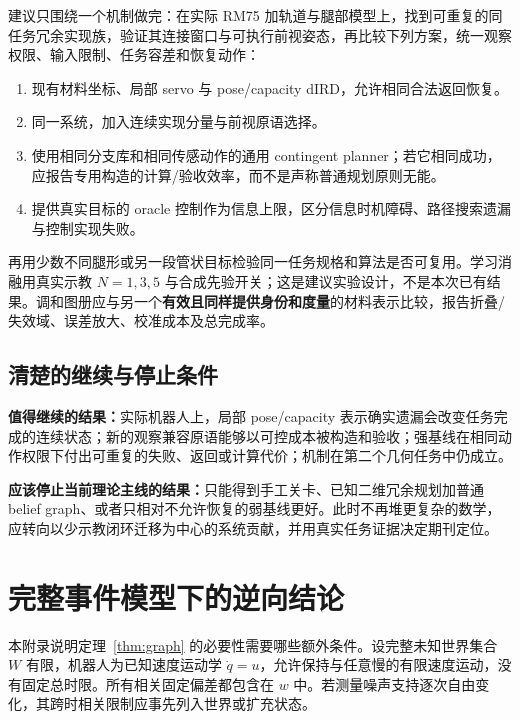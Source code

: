 \documentclass[11pt,a4paper]{article}
\theoremstyle{cn}
\begin{document}
建议只围绕一个机制做完：在实际 RM75 加轨道与腿部模型上，找到可重复的同任务冗余实现族，验证其连接窗口与可执行前视姿态，再比较下列方案，统一观察权限、输入限制、任务容差和恢复动作：

\begin{enumerate}
\item 现有材料坐标、局部 servo 与 pose/capacity dIRD，允许相同合法返回恢复。
\item 同一系统，加入连续实现分量与前视原语选择。
\item 使用相同分支库和相同传感动作的通用 contingent planner；若它相同成功，应报告专用构造的计算/验收效率，而不是声称普通规划原则无能。
\item 提供真实目标的 oracle 控制作为信息上限，区分信息时机障碍、路径搜索遗漏与控制实现失败。
\end{enumerate}

再用少数不同腿形或另一段管状目标检验同一任务规格和算法是否可复用。学习消融用真实示教 \(N=1,3,5\) 与合成先验开关；这是建议实验设计，不是本次已有结果。调和图册应与另一个\textbf{有效且同样提供身份和度量}的材料表示比较，报告折叠/失效域、误差放大、校准成本及总完成率。

\subsection{清楚的继续与停止条件}

\begin{corebox}
\textbf{值得继续的结果：}实际机器人上，局部 pose/capacity 表示确实遗漏会改变任务完成的连续状态；新的观察兼容原语能够以可控成本被构造和验收；强基线在相同动作权限下付出可重复的失败、返回或计算代价；机制在第二个几何任务中仍成立。

\textbf{应该停止当前理论主线的结果：}只能得到手工关卡、已知二维冗余规划加普通 belief graph、或者只相对不允许恢复的弱基线更好。此时不再堆更复杂的数学，应转向以少示教闭环迁移为中心的系统贡献，并用真实任务证据决定期刊定位。
\end{corebox}

\clearpage
\appendix
\section{完整事件模型下的逆向结论}
\label{app:complete}

本附录说明定理~\ref{thm:graph} 的必要性需要哪些额外条件。设完整未知世界集合 \(W\) 有限，机器人为已知速度运动学 \(\dot q=u\)，允许保持与任意慢的有限速度运动，没有固定总时限。所有相关固定偏差都包含在 \(w\) 中。若测量噪声支持逐次自由变化，其跨时相关限制应事先列入世界或扩充状态。
\end{document}
